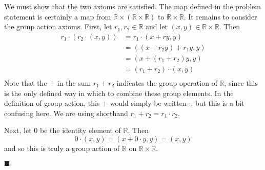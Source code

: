\documentclass[12pt]{article}
\renewcommand{\qed}{\hfill$\blacksquare$}
\renewenvironment{proof}{\begin{addmargin}[1em]{0em}\begin{newproof}}{\end{newproof}\end{addmargin}\qed}
\begin{document}
\begin{proof}
We must show that the two axioms are satisfied. The map defined in the problem statement is certainly a map from $\mathbb{R}\times\left(\mathbb{R}\times\mathbb{R}\right)$ to $\mathbb{R}\times\mathbb{R}$. It remains to consider the group action axioms. First, let $r_1,r_2 \in \mathbb{R}$ and let $\left(x,y\right)\in \mathbb{R}\times\mathbb{R}$. Then
\begin{equation*}
    \begin{split}
        r_1\cdot\left(r_2\cdot \left(x,y\right)\right) & = r_1\cdot \left(x+ry,y\right) \\
        & = \left(\left(x+r_2y\right)+r_1y,y\right) \\
        & = \left(x+ \left(r_1+r_2\right)y,y\right) \\
        & = \left(r_1+r_2\right)\cdot \left(x,y\right) \\
    \end{split}
\end{equation*}
Note that the $+$ in the sum $r_1+r_2$ indicates the group operation of $\mathbb{R}$, since this is the only defined way in which to combine these group elements. In the definition of group action, this $+$ would simply be written $\cdot$, but this is a bit confusing here. We are using shorthand $r_1+r_2 = r_1\cdot r_2$.

Next, let $0$ be the identity element of $\mathbb{R}$. Then
$$ 0\cdot \left(x,y\right) = \left(x+0\cdot y,y\right) =\left(x,y\right) $$
and so this is truly a group action of $\mathbb{R}$ on $\mathbb{R}\times\mathbb{R}$.
\end{proof}
\end{document}
